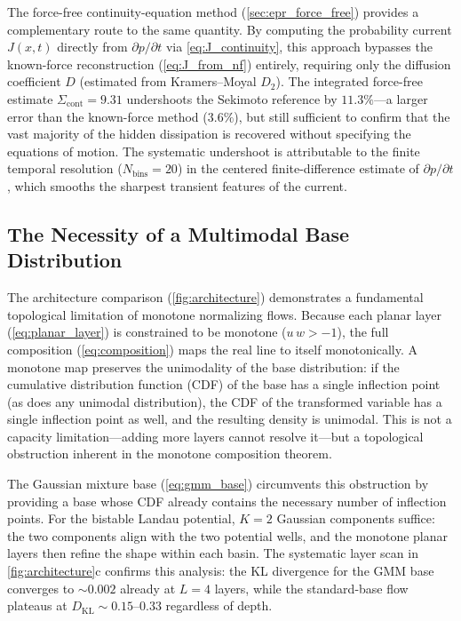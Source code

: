 The force-free continuity-equation method (\cref{sec:epr_force_free}) provides a complementary route to the same quantity.
By computing the probability current $J(x,t)$ directly from $\partial p/\partial t$ via \cref{eq:J_continuity}, this approach bypasses the known-force reconstruction (\cref{eq:J_from_nf}) entirely, requiring only the diffusion coefficient $D$ (estimated from Kramers--Moyal $D_2$).
The integrated force-free estimate $\Sigma_{\mathrm{cont}} = \num{9.31}$ undershoots the Sekimoto reference by $\num{11.3}\%$---a larger error than the known-force method ($\num{3.6}\%$), but still sufficient to confirm that the vast majority of the hidden dissipation is recovered without specifying the equations of motion.
The systematic undershoot is attributable to the finite temporal resolution ($N_{\mathrm{bins}} = 20$) in the centered finite-difference estimate of $\partial p/\partial t$, which smooths the sharpest transient features of the current.

\subsection{The Necessity of a Multimodal Base Distribution}

The architecture comparison (\cref{fig:architecture}) demonstrates a fundamental topological limitation of monotone normalizing flows.
Because each planar layer (\cref{eq:planar_layer}) is constrained to be monotone ($u\,w > -1$), the full composition (\cref{eq:composition}) maps the real line to itself monotonically.
A monotone map preserves the unimodality of the base distribution: if the cumulative distribution function (CDF) of the base has a single inflection point (as does any unimodal distribution), the CDF of the transformed variable has a single inflection point as well, and the resulting density is unimodal.
This is not a capacity limitation---adding more layers cannot resolve it---but a topological obstruction inherent in the monotone composition theorem.

The Gaussian mixture base (\cref{eq:gmm_base}) circumvents this obstruction by providing a base whose CDF already contains the necessary number of inflection points.
For the bistable Landau potential, $K = 2$ Gaussian components suffice: the two components align with the two potential wells, and the monotone planar layers then refine the shape within each basin.
The systematic layer scan in \cref{fig:architecture}c confirms this analysis: the KL divergence for the GMM base converges to $\sim\!\num{0.002}$ already at $L = 4$ layers, while the standard-base flow plateaus at $D_{\mathrm{KL}} \sim \num{0.15}$--$\num{0.33}$ regardless of depth.

